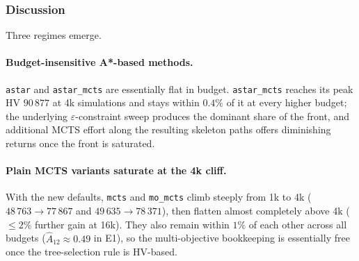 \begin{table}[t]
\centering
\caption{Mean hypervolume across all 10 maps and 30 seeds, by algorithm and simulation budget (E2). \texttt{astar} is budget-insensitive and shown for reference.}
\label{tab:e2_summary}
\small
{}
\end{table}

\subsubsection{Discussion}
Three regimes emerge.

\paragraph{Budget-insensitive A*-based methods.} \texttt{astar} and \texttt{astar\_mcts} are essentially flat in budget. \texttt{astar\_mcts} reaches its peak HV $90\,877$ at 4k simulations and stays within $0.4\%$ of it at every higher budget; the underlying $\varepsilon$-constraint sweep produces the dominant share of the front, and additional MCTS effort along the resulting skeleton paths offers diminishing returns once the front is saturated.

\paragraph{Plain MCTS variants saturate at the 4k cliff.} With the new defaults, \texttt{mcts} and \texttt{mo\_mcts} climb steeply from 1k to 4k ($48\,763 \to 77\,867$ and $49\,635 \to 78\,371$), then flatten almost completely above 4k ($\le 2\%$ further gain at 16k). They also remain within $1\%$ of each other across all budgets ($\hat A_{12}\approx 0.49$ in E1), so the multi-objective bookkeeping is essentially free once the tree-selection rule is HV-based.

